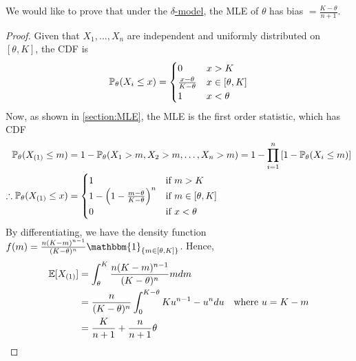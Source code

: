 We would like to prove that under the \hyperref[model: no-measurement-error]{$\delta$-model}, the MLE of $\theta$ has bias $= \frac{K-\theta}{n+1}$.
\begin{proof}
    Given that $X_1, \dots, X_n$ are independent and uniformly distributed on $[\theta, K]$, the CDF is \[
    \mathbb{P}_\theta(X_i \leq x) = \begin{cases}
                0 & x > K \\
                \frac{x-\theta}{K-\theta} & x \in [\theta, K] \\
                1 & x < \theta
            \end{cases}
    \]
    Now, as shown in \autoref{section:MLE}, the MLE is the first order statistic, which has CDF \begin{align*}
        \mathbb{P}_\theta(X_{(1)} \leq m) &= 1 - \mathbb{P}_\theta(X_1 > m, X_2 > m, \dots, X_n > m) = 1 - \prod_{i=1}^n \left[1 - \mathbb{P}_\theta(X_i \leq m)\right] \\
        \therefore \mathbb{P}_\theta(X_{(1)} \leq x) &= \begin{cases}
                1 & \text{if $m > K$} \\
                1 - \left(1 - \frac{m-\theta}{K-\theta}\right)^n & \text{if $m \in [\theta, K]$} \\
                0 & \text{if $x < \theta$}
            \end{cases}
    \end{align*}
    By differentiating, we have the density function $f(m) = \frac{n(K-m)^{n-1}}{(K-\theta)^n} \mathbbm{1}_{\left\{ m \in [\theta, K] \right\}}$. Hence, \begin{align*}
        \mathbb{E}[X_{(1)}] &= \int_\theta^K \frac{n(K-m)^{n-1}}{(K-\theta)^n} m dm \\
            &= \frac{n}{(K-\theta)^n} \int_0^{K-\theta} Ku^{n-1} - u^n du \quad \text{where $u = K - m$} \\
            &= \frac{K}{n+1} + \frac{n}{n+1}\theta
    \end{align*}
\end{proof}